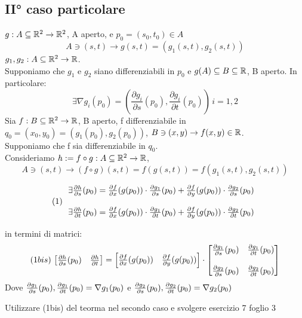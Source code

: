 \subsection{II° caso particolare}
$g: A \subseteq \mathbb{R}^2 \to \mathbb{R}^2$, A aperto, e $p_0 = (s_0,t_0)\in A$
$$A \ni (s,t) \rightarrow g(s,t) = (g_1(s,t), g_2(s,t))$$
$g_1, g_2 : A \subseteq \mathbb{R}^2 \to \mathbb{R}$. \\
Supponiamo che $g_1$ e $g_2$ siano differenziabili in $p_0$ e $g(A) \subseteq B \subseteq \mathbb{R}$, B aperto. 
In particolare:
$$\exists \nabla g_i(p_0) = \left(\frac{\partial g_i}{\partial s}(p_0), \frac{\partial g_i}{\partial t}(p_0)\right) \, i = 1,2$$
Sia $f : B \subseteq \mathbb{R}^2 \to \mathbb{R}$, B aperto, f differenziabile in $q_0 = (x_0,y_0)=(g_1(p_0),g_2(p_0))$, 
$B \ni (x,y) \rightarrow f(x,y)\in \mathbb{R}$. \\
Supponiamo che f sia differenziabile in $q_0$. \\
Consideriamo $h := f \circ g : A \subseteq \mathbb{R}^2 \to \mathbb{R}$,
$$A \ni (s,t) \rightarrow (f\circ g)(s,t) = f(g(s,t)) = f(g_1(s,t),g_2(s,t))$$
\begin{theorem}
  $$(1) \, \begin{array}{l}
    \exists \frac{\partial h}{\partial s}(p_0) = \frac{\partial f}{\partial x}(g(p_0)) \cdot \frac{\partial g_1}{\partial s}(p_0) + \frac{\partial f}{\partial y}(g(p_0)) \cdot \frac{\partial g_2}{\partial s}(p_0) \\
    \\
    \exists \frac{\partial h}{\partial t}(p_0) = \frac{\partial f}{\partial x}(g(p_0)) \cdot \frac{\partial g_1}{\partial t}(p_0) + \frac{\partial f}{\partial y}(g(p_0)) \cdot \frac{\partial g_2}{\partial t}(p_0) \\
  \end{array}$$
\end{theorem}
in termini di matrici:
$$(1bis) \, \begin{bmatrix}
  \frac{\partial h}{\partial s}(p_0) & \frac{\partial h}{\partial t} \\
\end{bmatrix} = \begin{bmatrix}
  \frac{\partial f}{\partial x}(g(p_0)) & \frac{\partial f}{\partial y}(g(p_0)) \\
\end{bmatrix} \cdot \begin{bmatrix}
  \frac{\partial g_1}{\partial s}(p_0) & \frac{\partial g_1}{\partial t}(p_0)\\
  \\
  \frac{\partial g_2}{\partial s}(p_0) & \frac{\partial g_2}{\partial t}(p_0) \\
\end{bmatrix}$$
Dove $\frac{\partial g_1}{\partial s}(p_0), \frac{\partial g_1}{\partial t}(p_0) = \nabla g_1(p_0)$ e 
$\frac{\partial g_2}{\partial s}(p_0) ,\frac{\partial g_2}{\partial t}(p_0) = \nabla g_2 (p_0)$
\begin{exercise}
  Utilizzare (1bis) del teorma nel secondo caso e svolgere esercizio 7 foglio 3
\end{exercise}
